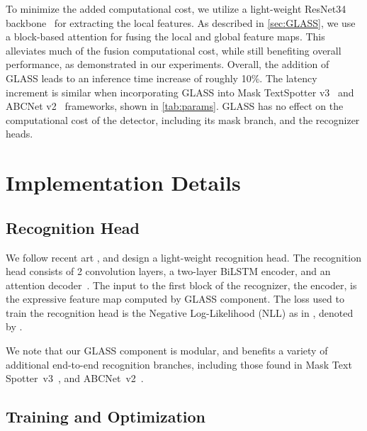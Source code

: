 \documentclass[runningheads]{llncs}
\begin{document}
To minimize the added computational cost, we utilize a light-weight ResNet34 backbone~\cite{focusing_att2017} for extracting the local features.
As described in \cref{sec:GLASS}, we use a block-based attention for fusing the local and global feature maps.
This alleviates much of the fusion computational cost, while still benefiting overall performance, as demonstrated in our experiments.
Overall, the addition of GLASS leads to an inference time increase of roughly 10\%.
The latency increment is similar when incorporating GLASS into Mask TextSpotter v3~\cite{liao2020spotterV3} and ABCNet v2~\cite{liu2021abcnetV2} frameworks, shown in \cref{tab:params}.
GLASS has no effect on the computational cost of the detector, including its mask branch, and the recognizer heads.






















\section{Implementation Details}
\label{sec:technical_details}


\subsection{Recognition Head}
\label{sec:recognition}
We follow recent art \cite{liu2021abcnetV2}, and design a light-weight recognition head.
The recognition head consists of 2 convolution layers, a two-layer BiLSTM encoder, and an attention decoder~\cite{clova}.
The input to the first block of the recognizer, the encoder, is the expressive feature map  computed by GLASS component.
The loss used to train the recognition head is the Negative Log-Likelihood (NLL) as in \cite{focusing_att2017}, denoted by .

We note that our GLASS component is modular, and benefits a variety of additional end-to-end recognition branches, including those found in Mask Text Spotter~v3~\cite{liao2020spotterV3}, and ABCNet~v2~\cite{liu2021abcnetV2}.


\subsection{Training and Optimization}
\end{document}
